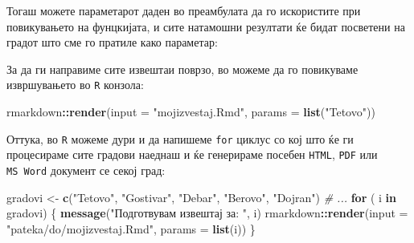 \documentclass[
]{book}
\newenvironment{Shaded}{\begin{snugshade}}{\end{snugshade}}
\newcommand{\CommentTok}[1]{\textcolor[rgb]{0.56,0.35,0.01}{\textit{#1}}}
\newcommand{\ControlFlowTok}[1]{\textcolor[rgb]{0.13,0.29,0.53}{\textbf{#1}}}
\newcommand{\DataTypeTok}[1]{\textcolor[rgb]{0.13,0.29,0.53}{#1}}
\newcommand{\KeywordTok}[1]{\textcolor[rgb]{0.13,0.29,0.53}{\textbf{#1}}}
\newcommand{\NormalTok}[1]{#1}
\newcommand{\OperatorTok}[1]{\textcolor[rgb]{0.81,0.36,0.00}{\textbf{#1}}}
\newcommand{\StringTok}[1]{\textcolor[rgb]{0.31,0.60,0.02}{#1}}
\begin{document}
\begin{Shaded}
\end{Shaded}

Тогаш можете параметарот даден во преамбулата да го искористите при повикувањето на фунцкијата, и сите натамошни резултати ќе бидат посветени на градот што сме го пратиле како параметар:

\begin{Shaded}
\end{Shaded}

За да ги направиме сите извештаи поврзо, во можеме да го повикуваме извршувањето во \texttt{R} конзола:

\begin{Shaded}
\begin{Highlighting}[]
\NormalTok{rmarkdown}\OperatorTok{::}\KeywordTok{render}\NormalTok{(}\DataTypeTok{input =} \StringTok{"mojizvestaj.Rmd"}\NormalTok{, }\DataTypeTok{params =} \KeywordTok{list}\NormalTok{(}\StringTok{"Tetovo"}\NormalTok{))}
\end{Highlighting}
\end{Shaded}

Оттука, во \texttt{R} можеме дури и да напишеме \texttt{for} циклус со кој што ќе ги процесираме сите градови наеднаш и ќе генерираме посебен \texttt{HTML}, \texttt{PDF} или \texttt{MS\ Word} документ се секој град:

\begin{Shaded}
\begin{Highlighting}[]
\NormalTok{gradovi <-}\StringTok{ }\KeywordTok{c}\NormalTok{(}\StringTok{"Tetovo"}\NormalTok{, }\StringTok{"Gostivar"}\NormalTok{, }\StringTok{"Debar"}\NormalTok{, }\StringTok{"Berovo"}\NormalTok{, }\StringTok{"Dojran"}\NormalTok{) }\CommentTok{# ...}
\ControlFlowTok{for}\NormalTok{ ( i }\ControlFlowTok{in}\NormalTok{ gradovi) \{}
  \KeywordTok{message}\NormalTok{(}\StringTok{"Подготвувам извештај за: "}\NormalTok{, i)}
\NormalTok{  rmarkdown}\OperatorTok{::}\KeywordTok{render}\NormalTok{(}\DataTypeTok{input =} \StringTok{"pateka/do/mojizvestaj.Rmd"}\NormalTok{, }\DataTypeTok{params =} \KeywordTok{list}\NormalTok{(i))}
\NormalTok{\}}
\end{Highlighting}
\end{Shaded}
\end{document}
